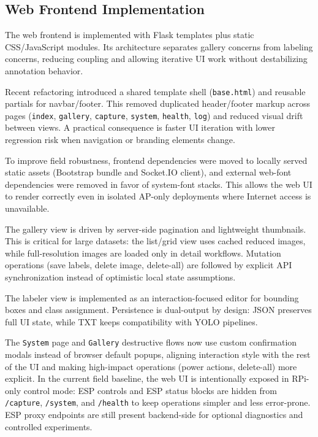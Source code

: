 \subsection{Web Frontend Implementation}
The web frontend is implemented with Flask templates plus static CSS/JavaScript modules. Its architecture separates gallery concerns from labeling concerns, reducing coupling and allowing iterative UI work without destabilizing annotation behavior.

Recent refactoring introduced a shared template shell (\texttt{base.html}) and reusable partials for navbar/footer. This removed duplicated header/footer markup across pages (\texttt{index}, \texttt{gallery}, \texttt{capture}, \texttt{system}, \texttt{health}, \texttt{log}) and reduced visual drift between views. A practical consequence is faster UI iteration with lower regression risk when navigation or branding elements change.

To improve field robustness, frontend dependencies were moved to locally served static assets (Bootstrap bundle and Socket.IO client), and external web-font dependencies were removed in favor of system-font stacks. This allows the web UI to render correctly even in isolated AP-only deployments where Internet access is unavailable.

The gallery view is driven by server-side pagination and lightweight thumbnails. This is critical for large datasets: the list/grid view uses cached reduced images, while full-resolution images are loaded only in detail workflows. Mutation operations (save labels, delete image, delete-all) are followed by explicit API synchronization instead of optimistic local state assumptions.

The labeler view is implemented as an interaction-focused editor for bounding boxes and class assignment. Persistence is dual-output by design: JSON preserves full UI state, while TXT keeps compatibility with YOLO pipelines.

The \texttt{System} page and \texttt{Gallery} destructive flows now use custom confirmation modals instead of browser default popups, aligning interaction style with the rest of the UI and making high-impact operations (power actions, delete-all) more explicit.
In the current field baseline, the web UI is intentionally exposed in RPi-only control mode: ESP controls and ESP status blocks are hidden from \texttt{/capture}, \texttt{/system}, and \texttt{/health} to keep operations simpler and less error-prone. ESP proxy endpoints are still present backend-side for optional diagnostics and controlled experiments.

